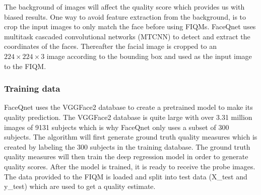 The background of images will affect the quality score which provides us with biased results. One way to avoid feature extraction from the background, is to crop the input images to only match the face before using FIQMs. FaceQnet uses multitask cascaded convolutional networks (MTCNN) to detect and extract the coordinates of the faces. Thereafter the facial image is cropped to an $224 \times 224 \times 3$ image according to the bounding box and used as the input image to the FIQM. 
\newpage

\subsubsection*{Training data}
FaceQnet uses the VGGFace2 \cite{VGGFace2} database to create a pretrained model to make its quality prediction. The VGGFace2 database is quite large with over 3.31 million images of 9131 subjects which is why FaceQnet only uses a subset of 300 subjects. The algorithm will first generate ground truth quality measures which is created by labeling the 300 subjects in the training database. The ground truth quality measures will then train the deep regression model in order to generate quality scores. After the model is trained, it is ready to receive the probe images. The data provided to the FIQM is loaded and split into test data (X\_test and y\_test) which are used to get a quality estimate. 

